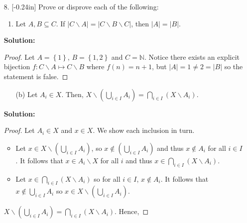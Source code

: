 \documentclass[letterpaper,12pt]{article}
\newcommand{\set}[1]{\left\{ #1 \right\}}
\theoremstyle{definition}
\begin{document}
\pagebreak
\begin{enumerate}
    \item[8.] \reversemarginpar{}[-0.24in] Prove or disprove each of the following: \begin{enumerate}
        \item Let $A,B \subseteq C$. If $|C \backslash A| = |C \backslash B \backslash C|$, then $|A| = |B|$.
    \end{enumerate}
     \begin{mdframed}
            \textbf{Solution:}
            \renewcommand{\proofname}{Disproof}
            \begin{proof}
                 Let $A  = \set{1}$, $B = \set{1,2}$ and $C = \mathbb{N}$. Notice there exists an explicit bijection $f: C \backslash A \mapsto  C \backslash B$ where $f(n) = n+1$, but $|A| = 1 \neq 2 = |B|$ so the statement is false.
            \end{proof}
        \end{mdframed}
\end{enumerate}
\pagebreak
\begin{enumerate}
    \item[] \begin{enumerate}
        \item[(b)] Let $A_i \in X$. Then, $X \backslash (\bigcup_{i \in I} A_i)   = \bigcap_{i \in I} (X \backslash A_i )$.
    \end{enumerate}
     \begin{mdframed}
            \textbf{Solution:}
            \begin{proof}
                Let $A_i \in X$ and $x \in X$. We show each inclusion in turn.
                \begin{itemize}
                    \item Let $x \in X \backslash (\bigcup_{i \in I} A_i)$, so $x \notin (\bigcup_{i \in I} A_i)$ and thus $x \notin A_i$ for all $i \in I$. It follows that $x \in A_i \backslash X$ for all $i$ and thus $x \in  \bigcap_{i \in I} (X \backslash A_i)$.
                    \item Let $x \in  \bigcap_{i \in I} (X \backslash A_i)$ so for all $i \in I$, $x \notin A_i$. It follows that $x \notin \bigcup_{i \in I} A_i$ so $x \in X \backslash (\bigcup_{i \in I} A_i)$.
                \end{itemize}$X \backslash (\bigcup_{i \in I} A_i)   = \bigcap_{i \in I} (X \backslash A_i )$.
                Hence, 
            \end{proof}
        \end{mdframed}
\end{enumerate}
\end{document}
